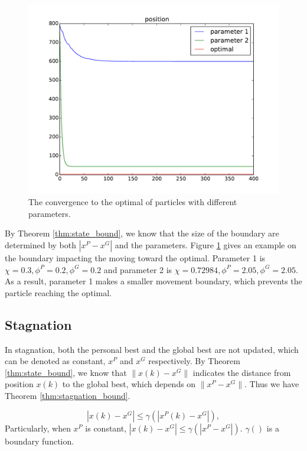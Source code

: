 \begin{figure}[tbph]
\centering
\includegraphics[width=0.7\linewidth]{./simfig/bound/bound_position}
\caption{The convergence to the optimal of particles with different parameters.}
\label{fig:bound_position}
\end{figure}

By Theorem \ref{thm:state_bound}, we know that the size of the boundary are determined by both  $ | x^{P} - x^{G} | $ and the parameters.
Figure \ref{fig:bound_position} gives an example on the boundary impacting the moving toward the optimal.
Parameter 1 is $ \chi = 0.3, \phi^{P} = 0.2, \phi^{G} = 0.2 $ and parameter 2 is $ \chi = 0.72984, \phi^{P} = 2.05, \phi^{G} = 2.05 $.
As a result, parameter 1 makes a smaller movement boundary, which prevents the particle reaching the optimal.

\subsection{Stagnation}

In stagnation, both the personal best and the global best are not updated, which can be denoted as constant, $ x^{P} $ and $ x^{G} $ respectively.
By Theorem \ref{thm:state_bound}, we know that $ \lVert x(k) - x^{G} \rVert $ indicates the distance from position $ x(k) $ to the global best, which depends on  $ \lVert x^{P} - x^{G} \rVert $.
Thus we have Theorem \ref{thm:stagnation_bound}.

\begin{mythm}
\label{thm:stagnation_bound}
\begin{equation}
\label{eq:stagnation_bound}
| x(k) - x^{G} | \leq \gamma ( | x^{P}(k) - x^{G} | ), 
\end{equation}
Particularly, when $ x^{P} $ is constant,
$  | x(k) - x^{G} | \leq \gamma ( | x^{P} - x^{G} | ). $
$ \gamma () $ is a boundary function.
\end{mythm}

